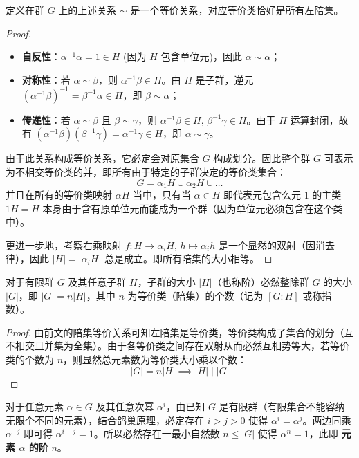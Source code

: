 \documentclass[11pt]{article}
\begin{document}
\begin{cnproperty}[陪集的等价关系和划分]
    定义在群 $G$ 上的上述关系 $\sim$ 是一个等价关系，对应等价类恰好是所有左陪集。
\end{cnproperty}
\begin{proof}
    \begin{itemize}
        \item \textbf{自反性}：$\alpha^{-1}\alpha = 1 \in H$ (因为 $H$ 包含单位元)，因此 $\alpha \sim \alpha$；
        \item \textbf{对称性}：若 $\alpha \sim \beta$，则 $\alpha^{-1}\beta \in H$。由 $H$ 是子群，逆元 $(\alpha^{-1}\beta)^{-1} = \beta^{-1}\alpha \in H$，即 $\beta \sim \alpha$；
        \item \textbf{传递性}：若 $\alpha \sim \beta$ 且 $\beta \sim \gamma$，则 $\alpha^{-1}\beta \in H, \, \beta^{-1}\gamma \in H$。由于 $H$ 运算封闭，故有 $(\alpha^{-1}\beta)(\beta^{-1}\gamma) = \alpha^{-1}\gamma \in H$，即 $\alpha \sim \gamma$。
    \end{itemize}
    由于此关系构成等价关系，它必定会对原集合 $G$ 构成划分。因此整个群 $G$ 可表示为不相交等价类的并，即所有由于特定的子群决定的等价类集合：
    $$ G = \alpha_1 H \cup \alpha_2 H \cup \dots $$
    并且在所有的等价类映射 $\alpha H$ 当中，只有当 $\alpha \in H$ 即代表元包含么元 $1$ 的主类 $1H = H$ 本身由于含有原单位元而能成为一个群（因为单位元必须包含在这个类中）。
    
    更进一步地，考察右乘映射 $f: H \to \alpha_i H, \, h \mapsto \alpha_i h$ 是一个显然的双射（因消去律），因此 $|H| = |\alpha_i H|$ 总是成立。即所有陪集的大小相等。
\end{proof}

\begin{cntheorem}
    对于有限群 $G$ 及其任意子群 $H$，子群的大小 $|H|$（也称阶）必然整除群 $G$ 的大小 $|G|$，即 $|G| = n |H|$，其中 $n$ 为等价类（陪集）的个数（记为 $[G:H]$ 或称指数）。
\end{cntheorem}
\begin{proof}
    由前文的陪集等价关系可知左陪集是等价类，等价类构成了集合的划分（互不相交且并集为全集）。由于各等价类之间存在双射从而必然互相势等大，若等价类的个数为 $n$，则显然总元素数为等价类大小乘以个数：
    $$ |G| = n|H| \implies |H| \mid |G| $$
\end{proof}

对于任意元素 $\alpha \in G$ 及其任意次幂 $\alpha^i$，由已知 $G$ 是有限群（有限集合不能容纳无限个不同的元素），结合鸽巢原理，必定存在 $i > j > 0$ 使得 $\alpha^i = \alpha^j$。两边同乘 $\alpha^{-j}$ 即可得 $\alpha^{i-j} = 1$。所以必然存在一最小自然数 $n \le |G|$ 使得 $\alpha^n = 1$，此即 \textbf{元素 $\alpha$ 的阶} $n$。
\end{document}

